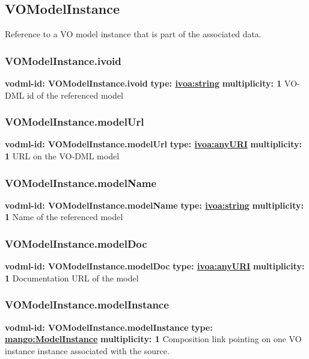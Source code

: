   \subsection{VOModelInstance}
  \label{sect:VOModelInstance}
    Reference to a VO model instance that is part of the associated data.

    \subsubsection{VOModelInstance.ivoid}
      \textbf{vodml-id: VOModelInstance.ivoid} \newline
      \textbf{type: \hyperref[sect:ivoa]{ivoa:string}} \newline
      \textbf{multiplicity: 1} \newline 
      VO-DML id of the referenced model

    \subsubsection{VOModelInstance.modelUrl}
      \textbf{vodml-id: VOModelInstance.modelUrl} \newline
      \textbf{type: \hyperref[sect:ivoa]{ivoa:anyURI}} \newline
      \textbf{multiplicity: 1} \newline 
      URL on the VO-DML model

    \subsubsection{VOModelInstance.modelName}
      \textbf{vodml-id: VOModelInstance.modelName} \newline
      \textbf{type: \hyperref[sect:ivoa]{ivoa:string}} \newline
      \textbf{multiplicity: 1} \newline 
      Name of the referenced model

    \subsubsection{VOModelInstance.modelDoc}
      \textbf{vodml-id: VOModelInstance.modelDoc} \newline
      \textbf{type: \hyperref[sect:ivoa]{ivoa:anyURI}} \newline
      \textbf{multiplicity: 1} \newline 
      Documentation URL of the model

    \subsubsection{VOModelInstance.modelInstance}
      \textbf{vodml-id: VOModelInstance.modelInstance} \newline
      \textbf{type: \hyperref[sect:ModelInstance]{mango:ModelInstance}} \newline
      \textbf{multiplicity: 1} \newline 
      Composition link pointing on one VO instance instance associated with the source.

